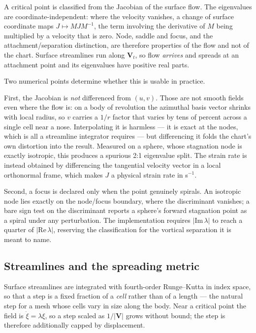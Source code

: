 \documentclass[submit]{aiaa-tc}%
\begin{document}
A critical point is classified from the Jacobian of the surface flow. The
eigenvalues are coordinate-independent: where the velocity vanishes, a
change of surface coordinate maps $J \mapsto M J M^{-1}$, the term
involving the derivative of $M$ being multiplied by a velocity that is
zero. Node, saddle and focus, and the attachment/separation distinction,
are therefore properties of the flow and not of the chart. Surface
streamlines run along $\mathbf{V}_t$, so flow \emph{arrives} and spreads
at an attachment point and its eigenvalues have positive real parts.

Two numerical points determine whether this is usable in practice.

First, the Jacobian is \emph{not} differenced from $(u,v)$. Those are not
smooth fields even where the flow is: on a body of revolution the
azimuthal basis vector shrinks with local radius, so $v$ carries a $1/r$
factor that varies by tens of percent across a single cell near a nose.
Interpolating it is harmless --- it is exact at the nodes, which is all a
streamline integrator requires --- but differencing it folds the chart's
own distortion into the result. Measured on a sphere, whose stagnation
node is exactly isotropic, this produces a spurious 2:1 eigenvalue split.
The strain rate is instead obtained by differencing the tangential
velocity vector in a local orthonormal frame, which makes $J$ a physical
strain rate in s$^{-1}$.

Second, a focus is declared only when the point genuinely spirals. An
isotropic node lies exactly on the node/focus boundary, where the
discriminant vanishes; a bare sign test on the discriminant reports a
sphere's forward stagnation point as a spiral under any perturbation. The
implementation requires $|\mathrm{Im}\,\lambda|$ to reach a quarter of
$|\mathrm{Re}\,\lambda|$, reserving the classification for the vortical
separation it is meant to name.

\subsection{Streamlines and the spreading metric}

Surface streamlines are integrated with fourth-order Runge--Kutta in index
space, so that a step is a fixed fraction of a \emph{cell} rather than of
a length --- the natural step for a mesh whose cells vary in size along
the body. Near a critical point the field is $\dot{\xi} = \lambda \xi$, so
a step scaled as $1/|\mathbf{V}|$ grows without bound; the step is
therefore additionally capped by displacement.
\end{document}
